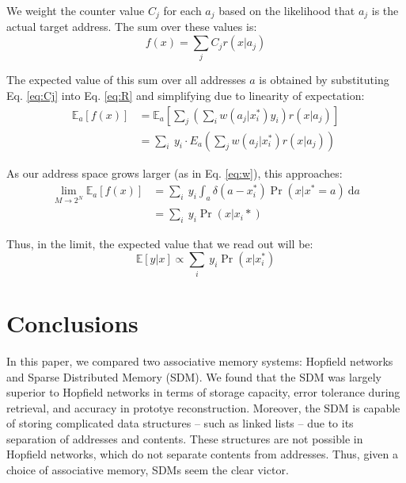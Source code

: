 \documentclass[10pt,letterpaper]{article}
\begin{document}
We weight the counter value $C_j$ for each $a_j$ based on the
likelihood that $a_j$ is the actual target address. The sum over these
values is:
\begin{equation}
f(x)=\sum_j C_j r(x| a_j)
\label{eq:R}
\end{equation}


The expected value of this sum over all addresses $a$ is obtained by
substituting Eq. \ref{eq:Cj} into Eq. \ref{eq:R} and simplifying due
to linearity of expectation:
\begin{align}
\mathbb{E}_a[f(x)]&=\mathbb{E}_a\left[\sum_j\left(\sum_i w(a_j| x_i^*)y_i\right)r(x|a_j)\right]\\
&=\sum_i\ y_i\cdot E_a\left(\sum_j w(a_j| x_i^*)r(x|a_j)\right)
\end{align}

As our address space grows larger (as in Eq. \ref{eq:w}), this approaches:
\begin{align}
\lim_{M\rightarrow 2^N} \mathbb{E}_a[f(x)]&=\sum_i\ y_i \int_a \delta(a-x_i^*)\Pr(x|x^*=a)\ \mathrm{d}a\\
&= \sum_i\ y_i\Pr(x|x_i*)
\end{align}

Thus, in the limit, the expected value that we read out will be:
\begin{equation}
\mathbb{E}[y|x]\propto \sum_i\ y_i\Pr(x|x_i^*)
\end{equation}



\section{Conclusions}

In this paper, we compared two associative memory systems: Hopfield
networks and Sparse Distributed Memory (SDM). We found that the SDM
was largely superior to Hopfield networks in terms of storage
capacity, error tolerance during retrieval, and accuracy in prototye
reconstruction. Moreover, the SDM is capable of storing complicated
data structures -- such as linked lists -- due to its separation of
addresses and contents.  These structures are not possible in Hopfield
networks, which do not separate contents from addresses. Thus, given a
choice of associative memory, SDMs seem the clear victor.
\end{document}

